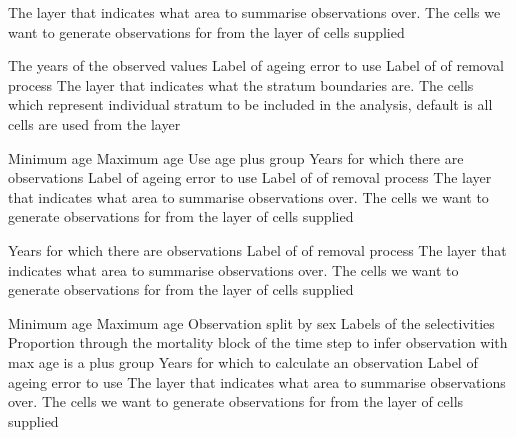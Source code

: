  {The layer that indicates what area to summarise observations over.}
 {The cells we want to generate observations for from the layer of cells supplied}
\par\textbf{}\par
{} {The years of the observed values}
 {Label of ageing error to use}
 {Label of of removal process}
 {The layer that indicates what the stratum boundaries are.}
 {The cells which represent individual stratum to be included in the analysis, default is all cells are used from the layer}
\par\textbf{}\par
{} {Minimum age}
 {Maximum age}
 {Use age plus group}
 {Years for which there are observations}
 {Label of ageing error to use}
 {Label of of removal process}
 {The layer that indicates what area to summarise observations over.}
 {The cells we want to generate observations for from the layer of cells supplied}
\par\textbf{}\par
{} {Years for which there are observations}
 {Label of of removal process}
 {The layer that indicates what area to summarise observations over.}
 {The cells we want to generate observations for from the layer of cells supplied}
\par\textbf{}\par
{} {Minimum age}
 {Maximum age}
 {Observation split by sex}
 {Labels of the selectivities}
 {Proportion through the mortality block of the time step to infer observation with}
 {max age is a plus group}
 {Years for which to calculate an observation}
 {Label of ageing error to use}
 {The layer that indicates what area to summarise observations over.}
 {The cells we want to generate observations for from the layer of cells supplied}

